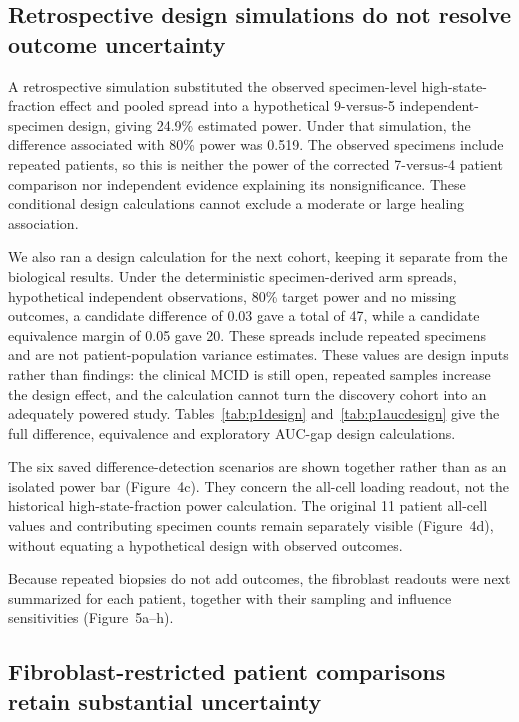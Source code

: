 \documentclass[10pt,a4paper]{article}
\begin{document}
\subsection{Retrospective design simulations do not resolve outcome uncertainty}

A retrospective simulation substituted the observed specimen-level high-state-fraction effect and pooled spread into a hypothetical 9-versus-5 independent-specimen design, giving 24.9\% estimated power. Under that simulation, the difference associated with 80\% power was 0.519. The observed specimens include repeated patients, so this is neither the power of the corrected 7-versus-4 patient comparison nor independent evidence explaining its nonsignificance. These conditional design calculations cannot exclude a moderate or large healing association.

We also ran a design calculation for the next cohort, keeping it separate from the biological results. Under the deterministic specimen-derived arm spreads, hypothetical independent observations, 80\% target power and no missing outcomes, a candidate difference of 0.03 gave a total of 47, while a candidate equivalence margin of 0.05 gave 20. These spreads include repeated specimens and are not patient-population variance estimates. These values are design inputs rather than findings: the clinical MCID is still open, repeated samples increase the design effect, and the calculation cannot turn the discovery cohort into an adequately powered study. Tables~\ref{tab:p1design} and~\ref{tab:p1aucdesign} give the full difference, equivalence and exploratory AUC-gap design calculations.

The six saved difference-detection scenarios are shown together rather than as an isolated power bar (Figure~4c). They concern the all-cell loading readout, not the historical high-state-fraction power calculation. The original 11 patient all-cell values and contributing specimen counts remain separately visible (Figure~4d), without equating a hypothetical design with observed outcomes.

Because repeated biopsies do not add outcomes, the fibroblast readouts were next summarized for each patient, together with their sampling and influence sensitivities (Figure~5a--h\label{call:p1f5}).

\subsection{Fibroblast-restricted patient comparisons retain substantial uncertainty}
\end{document}

